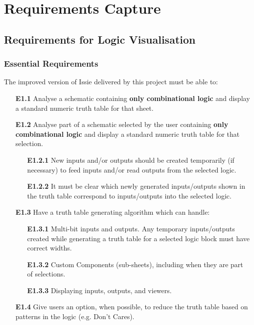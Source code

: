 \chapter{Requirements Capture} \label{chap:requirements}
\section{Requirements for Logic Visualisation}
\subsection*{Essential Requirements}
The improved version of Issie delivered by this project must be able to:
\begin{itemize}
    \item[\textbf{E1.1}] Analyse a schematic containing \textbf{only combinational logic} and display a standard numeric truth table for that sheet.
    \medskip
    \item[\textbf{E1.2}] Analyse part of a schematic selected by the user containing \textbf{only combinational logic} and display a standard numeric truth table for that selection.
    \begin{itemize}
        \item[\textbf{E1.2.1}] New inputs and/or outputs should be created temporarily (if necessary) to feed inputs and/or read outputs from the selected logic.
        \item[\textbf{E1.2.2}] It must be clear which newly generated inputs/outputs shown in the truth table correspond to inputs/outputs into the selected logic.
    \end{itemize}
    \medskip
    \item[\textbf{E1.3}] Have a truth table generating algorithm which can handle:
    \begin{itemize}
        \item[\textbf{E1.3.1}] Multi-bit inputs and outputs. Any temporary inputs/outputs created while generating a truth table for a selected logic block must have correct widths.
        \item[\textbf{E1.3.2}] Custom Components (sub-sheets), including when they are part of selections.
        \item[\textbf{E1.3.3}] Displaying inputs, outputs, and viewers.
    \end{itemize}
    \medskip
    \item[\textbf{E1.4}] Give users an option, when possible, to reduce the truth table based on patterns in the logic (e.g. Don't Cares).

\end{itemize}
